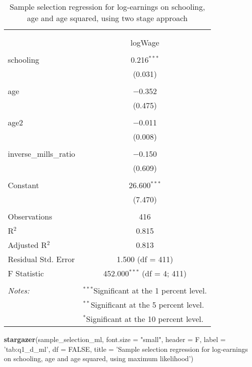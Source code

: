 \documentclass[
]{article}
\newenvironment{Shaded}{\begin{snugshade}}{\end{snugshade}}
\newcommand{\DataTypeTok}[1]{\textcolor[rgb]{0.13,0.29,0.53}{#1}}
\newcommand{\KeywordTok}[1]{\textcolor[rgb]{0.13,0.29,0.53}{\textbf{#1}}}
\newcommand{\NormalTok}[1]{#1}
\newcommand{\OtherTok}[1]{\textcolor[rgb]{0.56,0.35,0.01}{#1}}
\newcommand{\StringTok}[1]{\textcolor[rgb]{0.31,0.60,0.02}{#1}}
\begin{document}
\begin{table}[!htbp] \centering 
  \caption{Sample selection regression for log-earnings on schooling, age
          and age squared, using two stage approach} 
  \label{tab:q1_d_2sls} 
\small 
\begin{tabular}{@{\extracolsep{5pt}}lc} 
\\[-1.8ex]\hline 
\hline \\[-1.8ex] 
\\[-1.8ex] & logWage \\ 
\hline \\[-1.8ex] 
 schooling & 0.216$^{***}$ \\ 
  & (0.031) \\ 
  & \\ 
 age & $-$0.352 \\ 
  & (0.475) \\ 
  & \\ 
 age2 & $-$0.011 \\ 
  & (0.008) \\ 
  & \\ 
 inverse\_mills\_ratio & $-$0.150 \\ 
  & (0.609) \\ 
  & \\ 
 Constant & 26.600$^{***}$ \\ 
  & (7.470) \\ 
  & \\ 
Observations & 416 \\ 
R$^{2}$ & 0.815 \\ 
Adjusted R$^{2}$ & 0.813 \\ 
Residual Std. Error & 1.500 (df = 411) \\ 
F Statistic & 452.000$^{***}$ (df = 4; 411) \\ 
\hline \\[-1.8ex] 
\textit{Notes:} & \multicolumn{1}{l}{$^{***}$Significant at the 1 percent level.} \\ 
 & \multicolumn{1}{l}{$^{**}$Significant at the 5 percent level.} \\ 
 & \multicolumn{1}{l}{$^{*}$Significant at the 10 percent level.} \\ 
\end{tabular} 
\end{table}

\begin{Shaded}
\begin{Highlighting}[]
\KeywordTok{stargazer}\NormalTok{(sample_selection_ml,}
          \DataTypeTok{font.size =} \StringTok{"small"}\NormalTok{,}
          \DataTypeTok{header =}\NormalTok{ F, }\DataTypeTok{label =} \StringTok{'tab:q1_d_ml'}\NormalTok{,}
          \DataTypeTok{df =} \OtherTok{FALSE}\NormalTok{, }\DataTypeTok{title =} \StringTok{'Sample selection regression for log-earnings }
\StringTok{          on schooling, age and age squared, using maximum likelihood'}\NormalTok{)}
\end{Highlighting}
\end{Shaded}
\end{document}
